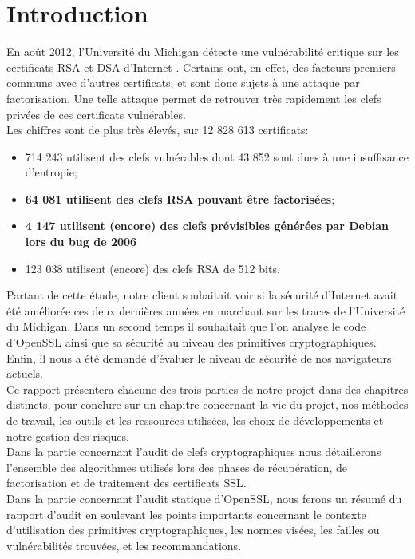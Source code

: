 \section*{Introduction}

En août 2012, l'Université du Michigan détecte une vulnérabilité critique sur les certificats RSA et DSA d'Internet \cite{mining2012nadia}. Certains ont, en effet, des facteurs premiers communs avec d'autres certificats, et sont donc sujets à une attaque par factorisation. Une telle attaque permet de retrouver très rapidement les clefs privées de ces certificats vulnérables.\\
Les chiffres sont de plus très élevés, sur 12 828 613 certificats:
\begin{itemize}
\item 714 243 utilisent des clefs vulnérables dont 43 852 sont dues à une insuffisance d'entropie;
\item \textbf{64 081 utilisent des clefs RSA pouvant être factorisées};
\item \textbf{4 147 utilisent (encore) des clefs prévisibles générées par Debian lors du bug de 2006}
\item 123 038 utilisent (encore) des clefs RSA de 512 bits.\\
\end{itemize}

Partant de cette étude, notre client souhaitait voir si la sécurité d'Internet avait été améliorée ces deux dernières années en marchant sur les traces de l'Université du Michigan. Dans un second temps il souhaitait que l'on analyse le code d'OpenSSL ainsi que sa sécurité au niveau des primitives cryptographiques. Enfin, il nous a été demandé d'évaluer le niveau de sécurité de nos navigateurs actuels.\\

Ce rapport présentera chacune des trois parties de notre projet dans des chapitres distincts, pour conclure sur un chapitre concernant la vie du projet, nos méthodes de travail, les outils et les ressources utilisées, les choix de développements et notre gestion des risques.\\

Dans la partie concernant l'audit de clefs cryptographiques nous détaillerons l'ensemble des algorithmes utilisés lors des phases de récupération, de factorisation et de traitement des certificats SSL.\\

Dans la partie concernant l'audit statique d'OpenSSL, nous ferons un résumé du rapport d'audit en soulevant les points importants concernant le contexte d'utilisation des primitives cryptographiques, les normes visées, les failles ou vulnérabilités trouvées, et les recommandations.\\

